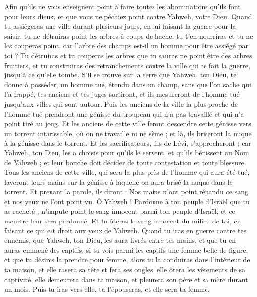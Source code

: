 \begin{multicols}{2}
Afin qu'ils ne vous enseignent point à faire toutes les abominations qu'ils font pour leurs dieux, et que vous ne péchiez point contre Yahweh, votre Dieu.
Quand tu assiégeras une ville durant plusieurs jours, en lui faisant la guerre pour la saisir, tu ne détruiras point les arbres à coups de hache, tu t’en nourriras et tu ne les couperas point, car l'arbre des champs est-il un homme pour être assiégé par toi ?
Tu détruiras et tu couperas les arbres que tu sauras ne point être des arbres fruitiers, et tu construiras des retranchements contre la ville qui te fait la guerre, jusqu'à ce qu'elle tombe.
\VerseOne{}S’il se trouve sur la terre que Yahweh, ton Dieu, te donne à posséder, un homme tué, étendu dans un champ, sans que l’on sache qui l’a frappé,
tes anciens et tes juges sortiront, et ils mesureront de l’homme tué jusqu'aux villes qui sont autour.
Puis les anciens de la ville la plus proche de l'homme tué prendront une génisse du troupeau qui n’a pas travaillé et qui n'a point tiré au joug.
Et les anciens de cette ville feront descendre cette génisse vers un torrent intarissable, où on ne travaille ni ne sème ; et là, ils briseront la nuque à la génisse dans le torrent.
Et les sacrificateurs, fils de Lévi, s'approcheront ; car Yahweh, ton Dieu, les a choisis pour qu’ils le servent, et qu’ils bénissent au Nom de Yahweh ; et leur bouche doit décider de toute contestation et toute blessure.
Tous les anciens de cette ville, qui sera la plus près de l'homme qui aura été tué, laveront leurs mains sur la génisse à laquelle on aura brisé la nuque dans le torrent.
Et prenant la parole, ils diront : Nos mains n'ont point répandu ce sang et nos yeux ne l'ont point vu.
Ô Yahweh ! Pardonne à ton peuple d'Israël que tu as racheté ; n’impute point le sang innocent parmi ton peuple d'Israël, et ce meurtre leur sera pardonné.
Et tu ôteras le sang innocent du milieu de toi, en faisant ce qui est droit aux yeux de Yahweh.
Quand tu iras en guerre contre tes ennemis, que Yahweh, ton Dieu, les aura livrés entre tes mains, et que tu en auras emmené des captifs,
si tu vois parmi les captifs une femme belle de figure, et que tu désires la prendre pour femme,
alors tu la conduiras dans l’intérieur de ta maison, et elle rasera sa tête et fera ses ongles,
elle ôtera les vêtements de sa captivité, elle demeurera dans ta maison, et pleurera son père et sa mère durant un mois. Puis tu iras vers elle, tu l’épouseras, et elle sera ta femme.

\end{multicols}
